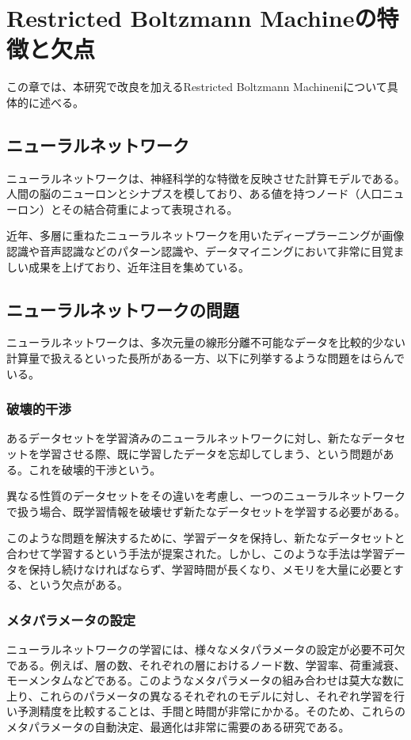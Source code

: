 \chapter{Restricted Boltzmann Machineの特徴と欠点}
この章では、本研究で改良を加えるRestricted Boltzmann Machineniについて具体的に述べる。

\section{ニューラルネットワーク}
ニューラルネットワークは、神経科学的な特徴を反映させた計算モデルである。人間の脳のニューロンとシナプスを模しており、ある値を持つノード（人口ニューロン）とその結合荷重によって表現される。

近年、多層に重ねたニューラルネットワークを用いたディープラーニングが画像認識や音声認識などのパターン認識や、データマイニングにおいて非常に目覚ましい成果を上げており、近年注目を集めている。

\section{ニューラルネットワークの問題}
ニューラルネットワークは、多次元量の線形分離不可能なデータを比較的少ない計算量で扱えるといった長所がある一方、以下に列挙するような問題をはらんでいる。

\subsection{破壊的干渉}
あるデータセットを学習済みのニューラルネットワークに対し、新たなデータセットを学習させる際、既に学習したデータを忘却してしまう、という問題がある。これを破壊的干渉という。

異なる性質のデータセットをその違いを考慮し、一つのニューラルネットワークで扱う場合、既学習情報を破壊せず新たなデータセットを学習する必要がある。

このような問題を解決するために、学習データを保持し、新たなデータセットと合わせて学習するという手法が提案された。しかし、このような手法は学習データを保持し続けなければならず、学習時間が長くなり、メモリを大量に必要とする、という欠点がある。

\subsection{メタパラメータの設定}
ニューラルネットワークの学習には、様々なメタパラメータの設定が必要不可欠である。例えば、層の数、それぞれの層におけるノード数、学習率、荷重減衰、モーメンタムなどである。このようなメタパラメータの組み合わせは莫大な数に上り、これらのパラメータの異なるそれぞれのモデルに対し、それぞれ学習を行い予測精度を比較することは、手間と時間が非常にかかる。そのため、これらのメタパラメータの自動決定、最適化は非常に需要のある研究である。

